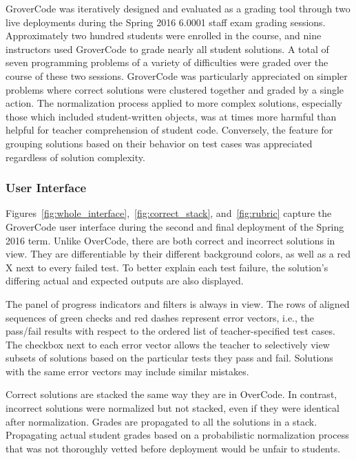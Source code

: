 GroverCode was iteratively designed and evaluated as a grading tool through two live deployments during the Spring 2016 6.0001 staff exam grading sessions. Approximately two hundred students were enrolled in the course, and nine instructors used GroverCode to grade nearly all student solutions. A total of seven programming problems of a variety of difficulties were graded over the course of these two sessions. GroverCode was particularly appreciated on simpler problems where correct solutions were clustered together and graded by a single action. The normalization process applied to more complex solutions, especially those which included student-written objects, was at times more harmful than helpful for teacher comprehension of student code. Conversely, the feature for grouping solutions based on their behavior on test cases was appreciated regardless of solution complexity.

\subsubsection{User Interface}

Figures~\ref{fig:whole_interface},~\ref{fig:correct_stack}, and~\ref{fig:rubric} capture the GroverCode user interface during the second and final deployment of the Spring 2016 term. Unlike OverCode, there are both correct and incorrect solutions in view. They are differentiable by their different background colors, as well as a red X next to every failed test. To better explain each test failure, the solution's differing actual and expected outputs are also displayed. 

The panel of progress indicators and filters is always in view. The rows of aligned sequences of green checks and red dashes represent error vectors, i.e., the pass/fail results with respect to the ordered list of teacher-specified test cases. The checkbox next to each error vector allows the teacher to selectively view subsets of solutions based on the particular tests they pass and fail. Solutions with the same error vectors may include similar mistakes.

Correct solutions are stacked the same way they are in OverCode. In contrast, incorrect solutions were normalized but not stacked, even if they were identical after normalization. Grades are propagated to all the solutions in a stack. Propagating actual student grades based on a probabilistic normalization process that was not thoroughly vetted before deployment would be unfair to students. 


